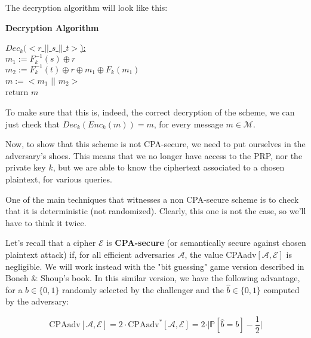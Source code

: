 \documentclass{article}
\newcommand\tab[1][1cm]{\hspace*{#1}}
\begin{document}
\vspace{5pt}

The decryption algorithm will look like this:

\begin{tcolorbox}

\textbf{Decryption Algorithm}

\tab \underline{$Dec_{k} (<r$ $\vert \vert$ $s$ $\vert \vert$ $t>$):}\\
\tab[1cm] $m_1 := F_k^{-1} (s) \oplus r$\\
\tab[1cm] $m_2 := F_k^{-1} (t) \oplus r \oplus m_1 \oplus F_k (m_1)$\\
\tab[1cm] $m := <m_1$ $\vert \vert$ $m_2>$\\
\tab[1cm] return $m$

\end{tcolorbox}

To make sure that this is, indeed, the correct decryption of the scheme, we can just check that $Dec_k (Enc_k (m)) = m$, for every message $m \in \mathcal{M}$.

\vspace{5pt}

Now, to show that this scheme is not CPA-secure, we need to put ourselves in the adversary's shoes. This means that we no longer have access to the PRP, nor the private key $k$, but we are able to know the ciphertext associated to a chosen plaintext, for various queries.

\vspace{5pt}

One of the main techniques that witnesses a non CPA-secure scheme is to check that it is deterministic (not randomized). Clearly, this one is not the case, so we'll have to think it twice.

\vspace{5pt}

Let's recall that a cipher $\mathcal{E}$ is \textbf{CPA-secure} (or semantically secure against chosen plaintext attack) if, for all efficient adversaries $\mathcal{A}$, the value CPAadv$[\mathcal{A}, \mathcal{E}]$ is negligible. We will work instead with the "bit guessing" game version described in Boneh \& Shoup's book. In this similar version, we have the following advantage, for a $b \in \{0, 1\}$ randomly selected by the challenger and the $\hat b \in \{0, 1\}$ computed by the adversary:

$$ \text{CPAadv}[\mathcal{A}, \mathcal{E}] = 2 \cdot \text{CPAadv}^{*}[\mathcal{A}, \mathcal{E}] = 2 \cdot \vert \mathbb{P}[\hat{b} = b] - \frac{1}{2} \vert$$
\end{document}
